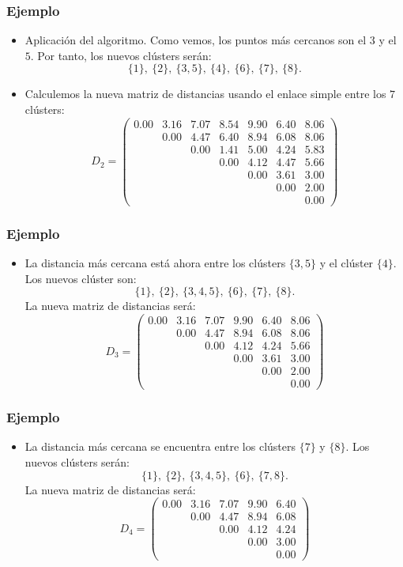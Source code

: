 \begin{frame}
\frametitle{Ejemplo}
\begin{itemize}
\item<2->{Aplicación del algoritmo.
Como vemos, los puntos más cercanos son el $3$ y el $5$. Por tanto, los nuevos clústers serán:
$$
\{1\},\ \{2\},\ \{3,5\},\ \{4\},\ \{6\},\ \{7\},\ \{8\}.
$$}
\item<3->{Calculemos la nueva matriz de distancias usando el enlace simple entre los $7$ clústers:
$$
D_2 = 
\begin{pmatrix}
0.00&3.16&7.07&8.54&9.90&6.40&8.06\\
&0.00&4.47&6.40&8.94&6.08&8.06\\
&&0.00&1.41&5.00&4.24&5.83\\
&&&0.00&4.12&4.47&5.66\\
&&&&0.00&3.61&3.00\\
&&&&&0.00&2.00\\
&&&&&&0.00
\end{pmatrix}
$$}
\end{itemize}
\end{frame}
\begin{frame}
\frametitle{Ejemplo}
\begin{itemize}
\item<2->{La distancia más cercana está ahora entre los clústers $\{3,5\}$ y el clúster $\{4\}$. Los nuevos clúster son:
$$
\{1\},\ \{2\},\ \{3,4,5\},\ \{6\},\ \{7\},\ \{8\}.
$$
La nueva matriz de distancias será:
$$
D_3 =
\begin{pmatrix}
0.00&3.16&7.07&9.90&6.40&8.06\\
&0.00&4.47&8.94&6.08&8.06\\
&&0.00&4.12&4.24&5.66\\
&&&0.00&3.61&3.00\\
&&&&0.00&2.00\\
&&&&&0.00
\end{pmatrix}
$$}
\end{itemize}
\end{frame}
\begin{frame}
\frametitle{Ejemplo}
\begin{itemize}
\item<2->{La distancia más cercana se encuentra entre los clústers $\{7\}$ y $\{8\}$. Los nuevos clústers serán:
$$
\{1\},\ \{2\},\ \{3,4,5\},\ \{6\},\ \{7,8\}.
$$
La nueva matriz de distancias será:
$$
D_4 = \begin{pmatrix}
0.00&3.16&7.07&9.90&6.40\\
&0.00&4.47&8.94&6.08\\
&&0.00&4.12&4.24\\
&&&0.00&3.00\\
&&&&0.00
\end{pmatrix}
$$}
\end{itemize}
\end{frame}

